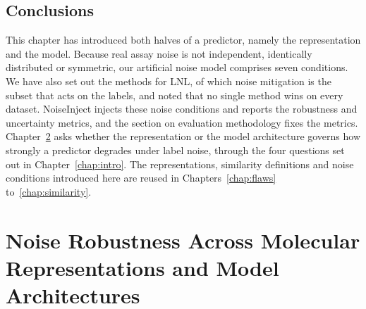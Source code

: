 \section{Conclusions}


This chapter has introduced both halves of a predictor, namely the representation and the model. Because real assay noise is not independent, identically distributed or symmetric, our artificial noise model comprises seven conditions. We have also set out the methods for LNL, of which noise mitigation is the subset that acts on the labels, and noted that no single method wins on every dataset. NoiseInject injects these noise conditions and reports the robustness and uncertainty metrics, and the section on evaluation methodology fixes the metrics. Chapter~\ref{chap:robustness} asks whether the representation or the model architecture governs how strongly a predictor degrades under label noise, through the four questions set out in Chapter~\ref{chap:intro}. The representations, similarity definitions and noise conditions introduced here are reused in Chapters~\ref{chap:flaws} to~\ref{chap:similarity}.

\chapter{Noise Robustness Across Molecular Representations and Model Architectures}\label{chap:robustness}

